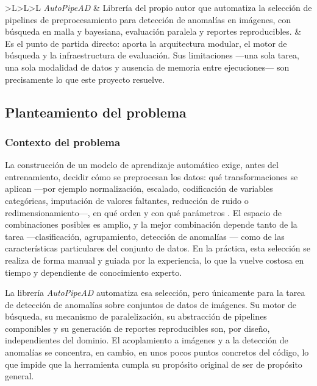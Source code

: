 \documentclass[12pt,letterpaper,oneside]{article}
\begin{document}
\begin{table}[H]
\begin{tabularx}{\textwidth}{>{}L>{}L>{}L}
\addlinespace
\textit{AutoPipeAD} \cite{borbon2026autopipead} &
Librería del propio autor que automatiza la selección de pipelines de preprocesamiento
para detección de anomalías en imágenes, con búsqueda en malla y bayesiana, evaluación
paralela y reportes reproducibles. &
Es el punto de partida directo: aporta la arquitectura modular, el motor de búsqueda y la
infraestructura de evaluación. Sus limitaciones —una sola tarea, una sola modalidad de
datos y ausencia de memoria entre ejecuciones— son precisamente lo que este proyecto
resuelve. \\
\bottomrule
\end{tabularx}
\end{table}

\subsection{Planteamiento del problema}

\subsubsection{Contexto del problema}

La construcción de un modelo de aprendizaje automático exige, antes del entrenamiento,
decidir cómo se preprocesan los datos: qué transformaciones se aplican —por ejemplo
normalización, escalado, codificación de variables categóricas, imputación de valores
faltantes, reducción de ruido o redimensionamiento—, en qué orden y con qué parámetros
\cite{garcia2015preprocessing}. El espacio de combinaciones posibles es amplio, y la
mejor combinación depende tanto de la tarea —clasificación, agrupamiento, detección de
anomalías \cite{chandola2009anomaly}— como de las características particulares del
conjunto de datos. En la práctica, esta selección se realiza de forma manual y guiada
por la experiencia, lo que la vuelve costosa en tiempo y dependiente de conocimiento
experto.

La librería \textit{AutoPipeAD} automatiza esa selección, pero únicamente para la tarea
de detección de anomalías sobre conjuntos de datos de imágenes. Su motor de búsqueda, su
mecanismo de paralelización, su abstracción de pipelines componibles y su generación de
reportes reproducibles son, por diseño, independientes del dominio. El acoplamiento a
imágenes y a la detección de anomalías se concentra, en cambio, en unos pocos puntos
concretos del código, lo que impide que la herramienta cumpla su propósito original de
ser de propósito general.
\end{document}
